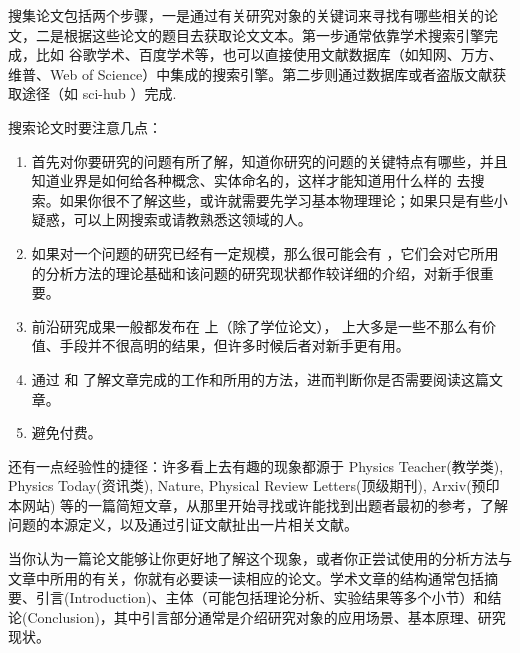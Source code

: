 \documentclass[a4paper,10pt,english]{sphinxmanual}
\begin{document}
搜集论文包括两个步骤，一是通过有关研究对象的关键词来寻找有哪些相关的论文，二是根据这些论文的题目去获取论文文本。第一步通常依靠学术搜索引擎完成，比如 谷歌学术、百度学术等，也可以直接使用文献数据库（如知网、万方、维普、Web of Science）中集成的搜索引擎。第二步则通过数据库或者盗版文献获取途径（如 sci-hub ）完成.

搜索论文时要注意几点：
\begin{enumerate}
\item {} 
首先对你要研究的问题有所了解，知道你研究的问题的关键特点有哪些，并且知道业界是如何给各种概念、实体命名的，这样才能知道用什么样的  去搜索。如果你很不了解这些，或许就需要先学习基本物理理论；如果只是有些小疑惑，可以上网搜索或请教熟悉这领域的人。

\item {} 
如果对一个问题的研究已经有一定规模，那么很可能会有  ，它们会对它所用的分析方法的理论基础和该问题的研究现状都作较详细的介绍，对新手很重要。

\item {} 
前沿研究成果一般都发布在  上（除了学位论文），  上大多是一些不那么有价值、手段并不很高明的结果，但许多时候后者对新手更有用。

\item {} 
通过  和  了解文章完成的工作和所用的方法，进而判断你是否需要阅读这篇文章。

\item {} 
避免付费。

\end{enumerate}

还有一点经验性的捷径：许多看上去有趣的现象都源于 Physics Teacher(教学类), Physics Today(资讯类), Nature, Physical Review Letters(顶级期刊), Arxiv(预印本网站) 等的一篇简短文章，从那里开始寻找或许能找到出题者最初的参考，了解问题的本源定义，以及通过引证文献扯出一片相关文献。

当你认为一篇论文能够让你更好地了解这个现象，或者你正尝试使用的分析方法与文章中所用的有关，你就有必要读一读相应的论文。学术文章的结构通常包括摘要、引言(Introduction)、主体（可能包括理论分析、实验结果等多个小节）和结论(Conclusion)，其中引言部分通常是介绍研究对象的应用场景、基本原理、研究现状。
\end{document}
